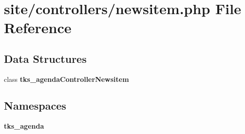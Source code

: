 \section{site/controllers/newsitem.php File Reference}
\label{site_2controllers_2newsitem_8php}
\subsection*{Data Structures}
\begin{DoxyCompactItemize}
\item 
class \textbf{ tks\+\_\+agenda\+Controller\+Newsitem}
\end{DoxyCompactItemize}
\subsection*{Namespaces}
\begin{DoxyCompactItemize}
\item 
 \textbf{ tks\+\_\+agenda}
\end{DoxyCompactItemize}
